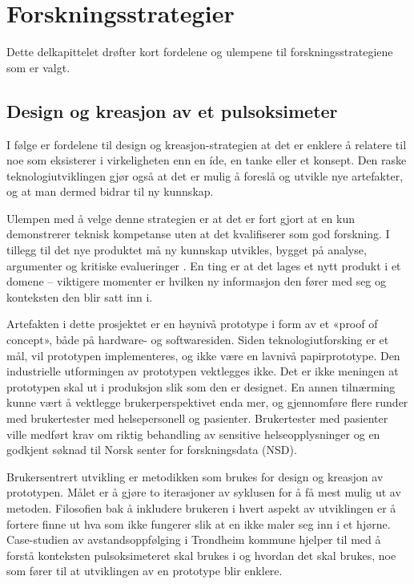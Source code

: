 \section{Forskningsstrategier}
\label{sec:forskningsstrategier}
Dette delkapittelet drøfter kort fordelene og ulempene til forskningsstrategiene som er valgt.

\subsection{Design og kreasjon av et pulsoksimeter}
I følge \citet[s.121-122]{oates} er fordelene til design og kreasjon-strategien at det er enklere å relatere til noe
som eksisterer i virkeligheten enn en íde, en tanke eller et konsept.
Den raske teknologiutviklingen gjør også at det er mulig å foreslå og utvikle nye artefakter, og at man dermed bidrar til ny kunnskap.

Ulempen med å velge denne strategien er at det er fort gjort at en kun demonstrerer
teknisk kompetanse uten at det kvalifiserer som god forskning. I tillegg til det nye produktet må ny kunnskap utvikles, bygget
på analyse, argumenter og kritiske evalueringer \citep[s. 109]{oates}. En ting er at det lages et nytt produkt i et domene --
viktigere momenter er hvilken ny informasjon den fører med seg og konteksten den blir satt inn i.

Artefakten i dette prosjektet er en høynivå prototype i form av et «proof of concept», både på hardware- og softwaresiden.
Siden teknologiutforsking er et mål, vil
prototypen implementeres, og ikke være en lavnivå papirprototype. Den industrielle utformingen av prototypen vektlegges ikke. Det er
ikke meningen at prototypen skal ut i produksjon slik som den er designet. En annen tilnærming kunne vært å vektlegge brukerperspektivet enda mer,
og gjennomføre flere runder med brukertester med helsepersonell og pasienter. Brukertester med pasienter ville medført krav om
riktig behandling av sensitive helseopplysninger og en godkjent søknad til Norsk senter for forskningsdata (NSD).

Brukersentrert utvikling er metodikken som brukes for design og kreasjon av prototypen.
Målet er å gjøre to iterasjoner av syklusen for å få mest mulig ut av metoden. Filosofien bak å inkludere brukeren i hvert aspekt
av utviklingen er å fortere finne ut hva som ikke fungerer slik at en ikke maler seg inn i et hjørne. Case-studien av avstandsoppfølging
i Trondheim kommune hjelper til med å forstå konteksten pulsoksimeteret skal brukes i og hvordan det skal brukes, noe
som fører til at utviklingen av en prototype blir enklere.

